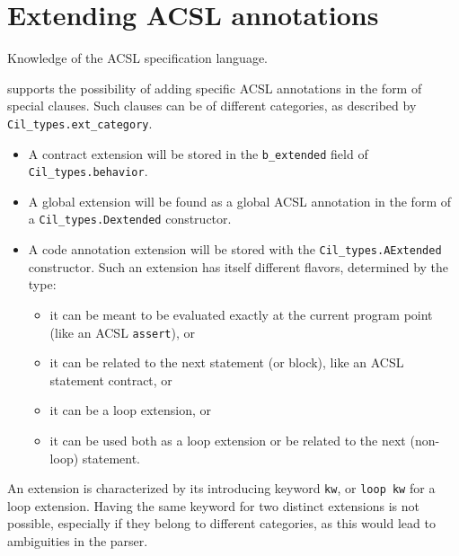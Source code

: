 

\section{Extending ACSL annotations}\label{sec:extend-acsl-annot}
\begin{prereq}
  Knowledge of the ACSL specification language.
\end{prereq}

\framac supports the possibility of adding specific ACSL annotations in the
form of special clauses.
Such clauses can be of different categories, as described by
\texttt{Cil\_types.ext\_category}.
\begin{itemize}
\item A contract extension will be
stored in the \texttt{b\_extended} field of
\texttt{Cil\_types.behavior}.
\item A global extension will be found as a global ACSL annotation in the form of a
\texttt{Cil\_types.Dextended} constructor.
\item A code annotation extension will be stored with the
\texttt{Cil\_types.AExtended}
constructor. Such an extension has itself
different flavors, determined by the  type:
\begin{itemize}
\item it can be meant to be evaluated exactly at the current program point
 (like an ACSL \texttt{assert}), or
\item it can be related to the next statement (or block), like an ACSL statement contract, or
\item it can be a loop extension, or
\item it can be used both as a loop extension or be related to the next (non-loop) statement.
\end{itemize}
\end{itemize}

An extension is characterized by its introducing keyword \texttt{kw}, or
\texttt{loop kw} for a loop extension. Having the same keyword for two distinct
extensions is not possible, especially if they belong to different categories,
as this would lead to ambiguities in the parser.

